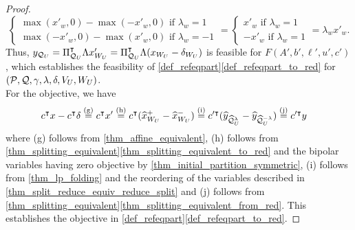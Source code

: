 \documentclass[pdflatex,sn-mathphys-num]{sn-jnl}%
\theoremstyle{thmstyleone}%
\theoremstyle{thmstylethree}%
\theoremstyle{thmstyletwo}%
\begin{document}
\begin{proof}
\begin{equation*}
\begin{cases}
        \max(x'_w,0)-\max(-x'_w,0)\text{ if $\lambda_w = 1$}\\
        \max(-x'_w,0)-\max(x'_w,0)\text{ if $\lambda_w=-1$}
    \end{cases} = \begin{cases}
        x'_w \text{ if $\lambda_w = 1$}\\
        -x'_w \text{ if $\lambda_w = 1$}
    \end{cases} = \lambda_w x'_w. 
    \end{equation*} Thus, $y_{\mathcal{Q}_U} = \Pi_{\mathcal{Q}_U}^{\intercal} \Lambda x'_{W_U} = \Pi_{\mathcal{Q}_U}^{\intercal} \Lambda (x_{W_U}-\delta_{W_U})$ is feasible for $F(A',b',\ell',u',c')$, which establishes the feasibility of \cref{def_refeqpart}\ref{def_refeqpart_to_red} for $(\mathcal{P},\mathcal{Q},\gamma, \lambda, \delta,V_U,W_U)$. \\For the objective, we have
    \begin{align*}
        c^{\intercal} x - c^{\intercal} \delta &\stackrel{\textup{(g)}}= c^{\intercal} x' \stackrel{\textup{(h)}}=
        c^{\intercal} (\widehat{x}_{W_U}^+ - \widehat{x}_{W_U}^-) \stackrel{\textup{(i)}}= c'^{\intercal}(\widehat{y}_{\widehat{\mathcal{Q}}^{\lambda}_U} - \widehat{y}_{\widehat{\mathcal{Q}}^{-\lambda}_U}) \stackrel{\textup{(j)}}= c'^{\intercal}y
    \end{align*}
    where \textup{(g)} follows from \cref{thm_affine_equivalent}, \textup{(h)} follows from \cref{thm_splitting_equivalent}\ref{thm_splitting_equivalent_to_red} and the bipolar variables having zero objective by \cref{thm_initial_partition_symmetric}, \textup{(i)} follows from \cref{thm_lp_folding} and the reordering of the variables described in \cref{thm_split_reduce_equiv_reduce_split} and \textup{(j)} follows from \cref{thm_splitting_equivalent}\ref{thm_splitting_equivalent_from_red}. This establishes the objective in \cref{def_refeqpart}\ref{def_refeqpart_to_red}.


\end{proof}
\end{document}
